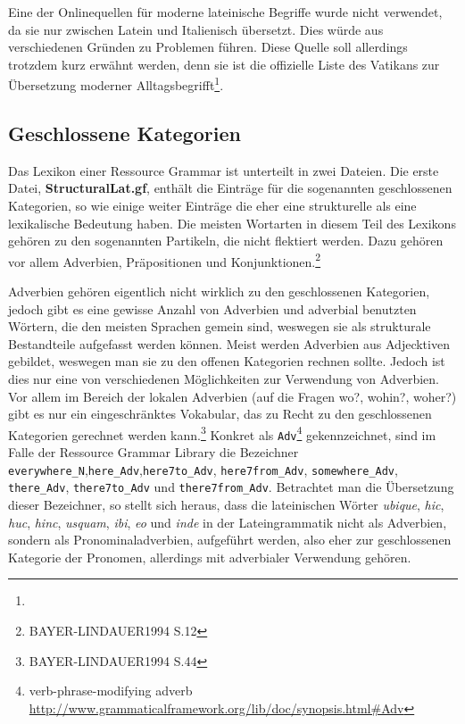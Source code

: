 \documentclass[12pt,abstract=on]{scrreprt}
\begin{document}
Eine der Onlinequellen für moderne lateinische Begriffe wurde nicht verwendet, da sie nur zwischen Latein und Italienisch übersetzt. Dies würde aus verschiedenen Gründen zu Problemen führen. Diese Quelle soll allerdings trotzdem kurz erwähnt werden, denn sie ist die offizielle Liste des Vatikans zur Übersetzung moderner Alltagsbegrifft\footnote{\vatlatinitas}.
\subsection{Geschlossene Kategorien}
Das Lexikon einer Ressource Grammar ist unterteilt in zwei Dateien. Die erste Datei, \textbf{StructuralLat.gf}, enthält die Einträge für die sogenannten geschlossenen Kategorien, so wie einige weiter Einträge die eher eine strukturelle als eine lexikalische Bedeutung haben. Die meisten Wortarten in diesem Teil des Lexikons gehören zu den sogenannten Partikeln, die nicht flektiert werden. Dazu gehören vor allem Adverbien, Präpositionen und Konjunktionen.\footnote{BAYER-LINDAUER1994 S.12} \par
Adverbien gehören eigentlich nicht wirklich zu den geschlossenen Kategorien, jedoch gibt es eine gewisse Anzahl von Adverbien und adverbial benutzten Wörtern, die den meisten Sprachen gemein sind, weswegen sie als strukturale Bestandteile aufgefasst werden können. Meist werden Adverbien aus Adjecktiven gebildet, weswegen man sie zu den offenen Kategorien rechnen sollte. Jedoch ist dies nur eine von verschiedenen Möglichkeiten zur Verwendung von Adverbien. Vor allem im  Bereich der lokalen Adverbien (auf die Fragen wo?, wohin?, woher?) gibt es nur ein eingeschränktes Vokabular, das zu Recht zu den geschlossenen Kategorien gerechnet werden kann.\footnote{BAYER-LINDAUER1994 S.44} 
Konkret als \texttt{Adv}\footnote{verb-phrase-modifying adverb \url{http://www.grammaticalframework.org/lib/doc/synopsis.html#Adv}} gekennzeichnet, sind im Falle der Ressource Grammar Library die Bezeichner \texttt{everywhere\_N},\texttt{here\_Adv},\texttt{here7to\_Adv}, \texttt{here7from\_Adv}, \texttt{somewhere\_Adv}, \texttt{there\_Adv}, \texttt{there7to\_Adv} und \texttt{there7from\_Adv}. Betrachtet man die Übersetzung dieser Bezeichner, so stellt sich heraus, dass die lateinischen Wörter \textit{ubique}, \textit{hic}, \textit{huc}, \textit{hinc}, \textit{usquam}, \textit{ibi}, \textit{eo} und \textit{inde} in der Lateingrammatik nicht als Adverbien, sondern als Pronominaladverbien, aufgeführt werden, also eher zur geschlossenen Kategorie der Pronomen, allerdings mit adverbialer Verwendung gehören. \par
\end{document}
